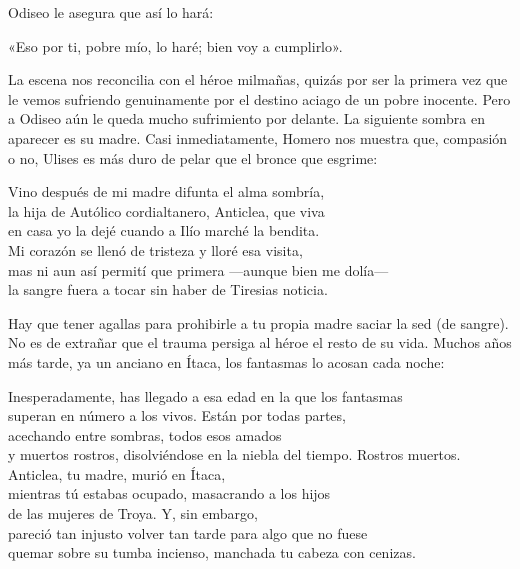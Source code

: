 Odiseo le asegura que así lo hará:

\begin{versocita}
«Eso por ti, pobre mío, lo haré; bien voy a cumplirlo».
\end{versocita}

La escena nos reconcilia con el héroe milmañas, quizás por ser la primera vez que le vemos sufriendo genuinamente por el destino aciago de un pobre inocente. Pero a Odiseo aún le queda mucho sufrimiento por delante. La siguiente sombra en aparecer es su madre. Casi inmediatamente, Homero nos muestra que, compasión o no, Ulises es más duro de pelar que el bronce que esgrime:

\begin{versocita}
Vino después de mi madre difunta el alma sombría,\\
la hija de Autólico cordialtanero, Anticlea, que viva\\
en casa yo la dejé cuando a Ilío marché la bendita.\\
Mi corazón se llenó de tristeza y lloré esa visita,\\
mas ni aun así permití que primera ---aunque bien me dolía---\\
la sangre fuera a tocar sin haber de Tiresias noticia.
\end{versocita}

Hay que tener agallas para prohibirle a tu propia madre saciar la sed (de sangre). No es de extrañar que el trauma persiga al héroe el resto de su vida. Muchos años más tarde, ya un anciano en Ítaca, los fantasmas lo acosan cada noche:

\begin{versopropio}
Inesperadamente, has llegado a esa edad en la que los fantasmas\\
superan en número a los vivos. Están por todas partes,\\
acechando entre sombras, todos esos amados\\
y muertos rostros, disolviéndose en la niebla del tiempo.
\stanzabreak
Rostros muertos. Anticlea, tu madre, murió en Ítaca,\\
mientras tú estabas ocupado, masacrando a los hijos\\
de las mujeres de Troya. Y, sin embargo,\\
pareció tan injusto volver tan tarde para algo que no fuese\\
quemar sobre su tumba incienso, manchada tu cabeza con cenizas.
\end{versopropio}

